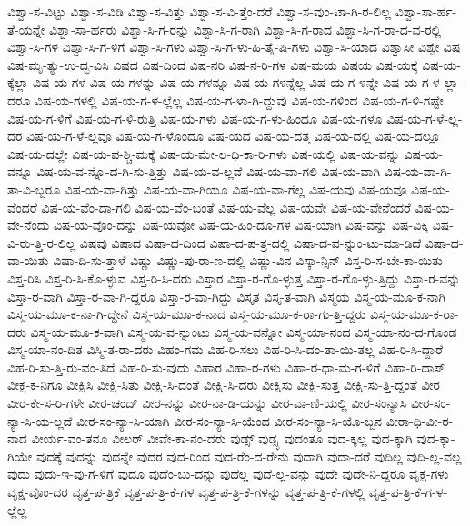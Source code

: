{ವಿಶ್ವಾ-ಸ-ವಿಟ್ಟು
ವಿಶ್ವಾ-ಸ-ವಿಡಿ
ವಿಶ್ವಾ-ಸ-ವಿತ್ತು
ವಿಶ್ವಾ-ಸ-ವಿ-ತ್ತೆಂ-ದರೆ
ವಿಶ್ವಾ-ಸ-ವುಂ-ಟಾ-ಗಿ-ರ-ಲಿಲ್ಲ
ವಿಶ್ವಾ-ಸಾ-ರ್ಹ-ತೆ-ಯನ್ನೇ
ವಿಶ್ವಾ-ಸಾ-ರ್ಹರು
ವಿಶ್ವಾ-ಸಿ-ಗ-ರನ್ನು
ವಿಶ್ವಾ-ಸಿ-ಗ-ರಾಗಿ
ವಿಶ್ವಾ-ಸಿ-ಗ-ರಾದ
ವಿಶ್ವಾ-ಸಿ-ಗ-ರಾ-ದ-ವ-ರಲ್ಲಿ
ವಿಶ್ವಾ-ಸಿ-ಗಳ
ವಿಶ್ವಾ-ಸಿ-ಗ-ಳಿಗೆ
ವಿಶ್ವಾ-ಸಿ-ಗಳು
ವಿಶ್ವಾ-ಸಿ-ಗ-ಳು-ಹಿ-ತೈ-ಷಿ-ಗಳು
ವಿಶ್ವಾ-ಸಿ-ಯಾದ
ವಿಶ್ವಾಸೀ
ವಿಶ್ವೇ
ವಿಷ
ವಿಷ-ಮೃ-ತ್ಯು-ಉ-ದ್ಭ-ವಿಸಿ
ವಿಷದ
ವಿಷ-ದಿಂದ
ವಿಷ-ನರಿ
ವಿಷ-ನ-ರಿ-ಗಳ
ವಿಷ-ಮಯ
ವಿಷಯ
ವಿಷ-ಯಕ್ಕೆ
ವಿಷ-ಯ-ಕ್ಕೆಲ್ಲಾ
ವಿಷ-ಯ-ಗಳ
ವಿಷ-ಯ-ಗಳನ್ನು
ವಿಷ-ಯ-ಗಳನ್ನೂ
ವಿಷ-ಯ-ಗಳನ್ನೆಲ್ಲ
ವಿಷ-ಯ-ಗ-ಳನ್ನೇ
ವಿಷ-ಯ-ಗ-ಳ-ಲ್ಲಾ-ದರೂ
ವಿಷ-ಯ-ಗಳಲ್ಲಿ
ವಿಷ-ಯ-ಗ-ಳ-ಲ್ಲೆಲ್ಲ
ವಿಷ-ಯ-ಗ-ಳಾ-ಗಿ-ದ್ದುವು
ವಿಷ-ಯ-ಗಳಿಂದ
ವಿಷ-ಯ-ಗ-ಳಿ-ಗಷ್ಟೇ
ವಿಷ-ಯ-ಗ-ಳಿಗೆ
ವಿಷ-ಯ-ಗ-ಳಿ-ರುತ್ತಿ
ವಿಷ-ಯ-ಗಳು
ವಿಷ-ಯ-ಗ-ಳು-ಹಿಂದೂ
ವಿಷ-ಯ-ಗಳೂ
ವಿಷ-ಯ-ಗ-ಳೆ-ಲ್ಲ-ದರ
ವಿಷ-ಯ-ಗ-ಳೆ-ಲ್ಲವೂ
ವಿಷ-ಯ-ಗ-ಳೊಂದೂ
ವಿಷ-ಯದ
ವಿಷ-ಯ-ದತ್ತ
ವಿಷ-ಯ-ದಲ್ಲಿ
ವಿಷ-ಯ-ದಲ್ಲೂ
ವಿಷ-ಯ-ದಲ್ಲೇ
ವಿಷ-ಯ-ಪ-ಶ್ಚಿ-ಮಕ್ಕೆ
ವಿಷ-ಯ-ಮೇ-ಲ-ಧಿ-ಕಾ-ರಿ-ಗಳು
ವಿಷ-ಯಲ್ಲಿ
ವಿಷ-ಯ-ವನ್ನು
ವಿಷ-ಯ-ವನ್ನೂ
ವಿಷ-ಯ-ವ-ನ್ನೊ-ದ-ಗಿ-ಸು-ತ್ತಿತ್ತು
ವಿಷ-ಯ-ವ-ಲ್ಲವೆ
ವಿಷ-ಯ-ವಾ-ಗಲಿ
ವಿಷ-ಯ-ವಾಗಿ
ವಿಷ-ಯ-ವಾ-ಗಿ-ತಾ-ವಿ-ಬ್ಬರೂ
ವಿಷ-ಯ-ವಾ-ಗಿತ್ತು
ವಿಷ-ಯ-ವಾ-ಗಿಯೂ
ವಿಷ-ಯ-ವಾ-ಗೆಲ್ಲ
ವಿಷ-ಯವು
ವಿಷ-ಯವೂ
ವಿಷ-ಯ-ವೆಂದರೆ
ವಿಷ-ಯ-ವೆಂ-ದಾ-ಗಲಿ
ವಿಷ-ಯ-ವೆಂ-ಬಂತೆ
ವಿಷ-ಯ-ವೆಲ್ಲ
ವಿಷ-ಯವೇ
ವಿಷ-ಯ-ವೇನೆಂದರೆ
ವಿಷ-ಯ-ವೇ-ನೆಂದು
ವಿಷ-ಯ-ವೊಂ-ದನ್ನು
ವಿಷ-ಯವೋ
ವಿಷ-ಯ-ಹಿಂ-ದೂ-ಗಳ
ವಿಷ-ಯಾಗಿ
ವಿಷ-ವನ್ನು
ವಿಷ-ವಿಕ್ಕಿ
ವಿಷ-ವಿ-ರು-ತ್ತಿ-ರ-ಲಿಲ್ಲ
ವಿಷವು
ವಿಷಾದ
ವಿಷಾ-ದ-ದಿಂದ
ವಿಷಾ-ದ-ಪ-ತ್ರ-ದಲ್ಲಿ
ವಿಷಾ-ದ-ವ-ನ್ನುಂ-ಟು-ಮಾ-ಡಿದೆ
ವಿಷಾ-ದ-ವಾ-ಯಿತು
ವಿಷಾ-ದಿ-ಸು-ತ್ತಾಳೆ
ವಿಷ್ಣು
ವಿಷ್ಣು-ಪು-ರಾ-ಣ-ದಲ್ಲಿ
ವಿಷ್ಣು-ವಿನ
ವಿಸ್ಕಾ-ನ್ಸಿನ್
ವಿಸ್ತ-ರಿ-ಸ-ಬೇ-ಕಾ-ಯಿತು
ವಿಸ್ತ-ರಿಸಿ
ವಿಸ್ತ-ರಿ-ಸಿ-ಕೊ-ಳ್ಳುವ
ವಿಸ್ತ-ರಿ-ಸಿ-ದರು
ವಿಸ್ತಾರ
ವಿಸ್ತಾ-ರ-ಗೊ-ಳ್ಳುತ್ತ
ವಿಸ್ತಾ-ರ-ಗೊ-ಳ್ಳು-ತ್ತಿದ್ದು
ವಿಸ್ತಾ-ರ-ವನ್ನು
ವಿಸ್ತಾ-ರ-ವಾಗಿ
ವಿಸ್ತಾ-ರ-ವಾ-ಗಿ-ದ್ದರೂ
ವಿಸ್ತಾ-ರ-ವಾ-ಗಿದ್ದು
ವಿಸ್ತೃತ
ವಿಸ್ತೃ-ತ-ವಾಗಿ
ವಿಸ್ಮಯ
ವಿಸ್ಮ-ಯ-ಮೂ-ಕ-ನಾಗಿ
ವಿಸ್ಮ-ಯ-ಮೂ-ಕ-ನಾ-ಗಿ-ದ್ದೇನೆ
ವಿಸ್ಮ-ಯ-ಮೂ-ಕ-ನಾದ
ವಿಸ್ಮ-ಯ-ಮೂ-ಕ-ರಾ-ಗು-ತ್ತಿ-ದ್ದರು
ವಿಸ್ಮ-ಯ-ಮೂ-ಕ-ರಾ-ದರು
ವಿಸ್ಮ-ಯ-ಮೂ-ಕ-ವಾಗಿ
ವಿಸ್ಮ-ಯ-ವ-ನ್ನುಂಟು
ವಿಸ್ಮ-ಯ-ವನ್ನೋ
ವಿಸ್ಮ-ಯಾ-ನಂದ
ವಿಸ್ಮ-ಯಾ-ನಂ-ದ-ಗೊಂಡ
ವಿಸ್ಮ-ಯಾ-ನಂ-ದಿತ
ವಿಸ್ಮಿ-ತ-ರಾ-ದರು
ವಿಹಂ-ಗಮ
ವಿಹ-ರಿ-ಸಲು
ವಿಹ-ರಿ-ಸಿ-ದಂ-ತಾ-ಯಿ-ತಲ್ಲ
ವಿಹ-ರಿ-ಸಿ-ದ್ದಾರೆ
ವಿಹ-ರಿ-ಸು-ತ್ತಿ-ರು-ವಂ-ತಿದೆ
ವಿಹ-ರಿ-ಸು-ವುದು
ವಿಹಾರ
ವಿಹಾ-ರ-ಗಳು
ವಿಹಾ-ರ-ಧಾ-ಮ-ಗ-ಳಿಗೆ
ವಿಹಾ-ರಿ-ದಾಸ್
ವೀಕ್ಷ-ಕ-ನಿಗೂ
ವೀಕ್ಷಿಸಿ
ವೀಕ್ಷಿ-ಸಿತು
ವೀಕ್ಷಿ-ಸಿ-ದಂತೆ
ವೀಕ್ಷಿ-ಸಿ-ದರು
ವೀಕ್ಷಿಸು
ವೀಕ್ಷಿ-ಸುತ್ತ
ವೀಕ್ಷಿ-ಸು-ತ್ತಿ-ದ್ದಂತೆ
ವೀರ
ವೀರ-ಕೇ-ಸ-ರಿ-ಗಳೇ
ವೀರ-ಚಂದ್
ವೀರ-ನನ್ನು
ವೀರ-ನಾ-ಡಿ-ಯನ್ನು
ವೀರ-ವಾ-ಣಿ-ಯಲ್ಲಿ
ವೀರ-ಸಂನ್ಯಾಸಿ
ವೀರ-ಸಂ-ನ್ಯಾ-ಸಿ-ಯ-ಲ್ಲದೆ
ವೀರ-ಸಂ-ನ್ಯಾ-ಸಿ-ಯಾಗಿ
ವೀರ-ಸಂ-ನ್ಯಾ-ಸಿ-ಯೆಂದ
ವೀರ-ಸಂ-ನ್ಯಾ-ಸಿ-ಯೊ-ಬ್ಬನ
ವೀರಾ-ಧಿ-ವೀ-ರ-ನಾದ
ವೀರ್ಯ-ವಂ-ತನೂ
ವೀಲರ್
ವೀವೇ-ಕಾ-ನಂ-ದರು
ವುಡ್ಸ್
ವುಡ್ಸ್ಳ
ವುದಂತೂ
ವುದ-ಕ್ಕಲ್ಲ
ವುದ-ಕ್ಕಾಗಿ
ವುದ-ಕ್ಕಾ-ಗಿಯೇ
ವುದಕ್ಕೆ
ವುದನ್ನು
ವುದನ್ನೇ
ವುದರ
ವುದ-ರಿಂದ
ವುದ-ರೆಂ-ದ-ರೇನು
ವುದಾಗಿ
ವುದಾ-ದರೆ
ವುದಿಲ್ಲ
ವುದಿ-ಲ್ಲ-ವಲ್ಲ
ವುದು
ವುದು-ಇ-ವು-ಗ-ಳಿಗೆ
ವುದೂ
ವುದೆಂ-ಬು-ದನ್ನು
ವುದೆಲ್ಲ
ವುದೆ-ಲ್ಲ-ವನ್ನು
ವುದೇ
ವುದೇ-ನಿ-ದ್ದರೂ
ವೃಕ್ಷ-ಗಳು
ವೃಕ್ಷ-ವೊಂ-ದರ
ವೃತ್ತ-ಪ-ತ್ರಿಕೆ
ವೃತ್ತ-ಪ-ತ್ರಿ-ಕೆ-ಗಳ
ವೃತ್ತ-ಪ-ತ್ರಿ-ಕೆ-ಗಳನ್ನು
ವೃತ್ತ-ಪ-ತ್ರಿ-ಕೆ-ಗಳಲ್ಲಿ
ವೃತ್ತ-ಪ-ತ್ರಿ-ಕೆ-ಗ-ಳ-ಲ್ಲೆಲ್ಲ
}
